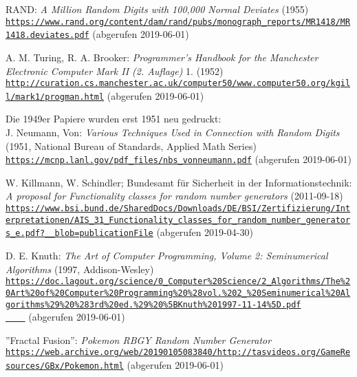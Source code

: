
\begin{thebibliography}{9}
    RAND:
    \textit{A Million Random Digits with 100,000 Normal Deviates} (1955)
    \\\texttt{\url{https://www.rand.org/content/dam/rand/pubs/monograph_reports/MR1418/MR1418.deviates.pdf}}
    (abgerufen 2019-06-01)

    A. M. Turing, R. A. Brooker:
    \textit{Programmer's Handbook for the Manchester Electronic Computer Mark II (2. Auflage)} 1. (1952)
    \\\texttt{\url{http://curation.cs.manchester.ac.uk/computer50/www.computer50.org/kgill/mark1/progman.html}}
    (abgerufen 2019-06-01)

    Die 1949er Papiere wurden erst 1951 neu gedruckt:
    \\J. Neumann, Von:
    \textit{Various Techniques Used in Connection with Random Digits}
    (1951, National Bureau of Standards, Applied Math Series)
    \\\texttt{\url{https://mcnp.lanl.gov/pdf_files/nbs_vonneumann.pdf}}
    (abgerufen 2019-06-01)

    W. Killmann, W. Schindler; Bundesamt f\"ur Sicherheit in der Informationstechnik:
    \textit{A proposal for Functionality classes for random number generators} (2011-09-18)
    \\\texttt{\url{https://www.bsi.bund.de/SharedDocs/Downloads/DE/BSI/Zertifizierung/Interpretationen/AIS_31_Functionality_classes_for_random_number_generators_e.pdf?__blob=publicationFile}}
    (abgerufen 2019-04-30)

    D. E. Knuth:
    \textit{The Art of Computer Programming, Volume 2: Seminumerical Algorithms} (1997, Addison-Wesley)
    \\\texttt{\url{https://doc.lagout.org/science/0_Computer%
    }}
    (abgerufen 2019-06-01)

    ''Fractal Fusion'':
    \textit{Pokemon RBGY Random Number Generator}
    \\\texttt{\url{https://web.archive.org/web/20190105083840/http://tasvideos.org/GameResources/GBx/Pokemon.html}}
    (abgerufen 2019-06-01)


\end{thebibliography}
